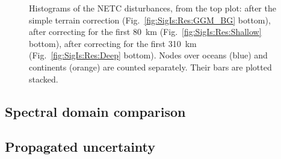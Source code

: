 \begin{figure}
    \begin{adjustbox}{center}
    \end{adjustbox}
    \caption[Histograms of the NETC disturbances, including the first \num{80} and \SI{310}{\kilo \metre} corrections.]{
        Histograms of the NETC disturbances, from the top plot: after the simple terrain correction (Fig.~\ref{fig:SigIs:Res:GGM_BG} bottom), after correcting for the first \SI{80}{\kilo \metre} (Fig.~\ref{fig:SigIs:Res:Shallow} bottom), after correcting for the first \SI{310}{\kilo \metre} (Fig.~\ref{fig:SigIs:Res:Deep} bottom).
        Nodes over oceans (blue) and continents (orange) are counted separately. Their bars are plotted stacked.
    }
    \label{fig:SigIs:Res:HistBGs}
\end{figure}

\FloatBarrier

\subsection{Spectral domain comparison}
\label{ss:SigIs:Results:Spectral}



\subsection{Propagated uncertainty}
\label{ss:SigIs:Results:Uncertainty}

